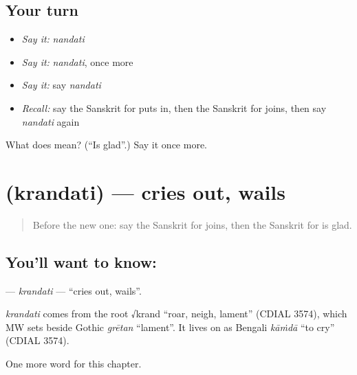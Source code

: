 \subsection*{Your turn}
\begin{itemize}
\raggedright
  \item \emph{Say it:} \emph{nandati}
  \item \emph{Say it:} \emph{nandati}, once more
  \item \emph{Say it:} say \emph{nandati}
  \item \emph{Recall:} say the Sanskrit for puts in, then the Sanskrit for joins, then say \emph{nandati} again
\end{itemize}

\begin{tcolorbox}[breakable,colback=teal!4,colframe=teal!35!black,title={Before you move on}]
What does  mean? (\textquotedblleft{}Is glad\textquotedblright{}.) Say it once more.
\end{tcolorbox}
\section[\texorpdfstring{\sk{क्रन्दति} (krandati)}{क्रन्दति (krandati)}]{ (krandati) — cries out, wails}

\label{lesson:SA-C145-krandati}



\begin{quote}
Before the new one: say the Sanskrit for joins, then the Sanskrit for is glad.
\end{quote}

\subsection*{You'll want to know: }
\textbf{} — \emph{krandati} — \textquotedblleft{}cries out, wails\textquotedblright{}.

\begin{cousinweb}
\emph{krandati} comes from the root √krand \textquotedblleft{}roar, neigh, lament\textquotedblright{} (CDIAL 3574), which MW sets beside Gothic \emph{grētan} \textquotedblleft{}lament\textquotedblright{}. It lives on as Bengali \emph{kāṁdā} \textquotedblleft{}to cry\textquotedblright{} (CDIAL 3574).
\end{cousinweb}

\begin{grammarlens}[title={What you've built}]
One more word for this chapter.
\end{grammarlens}

